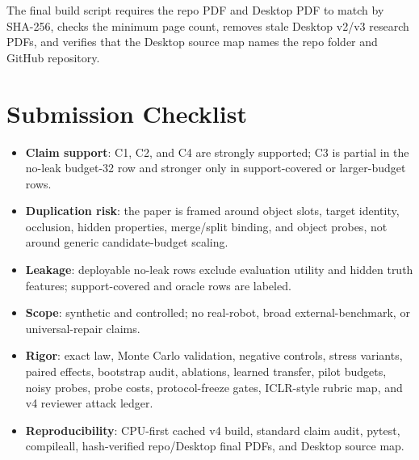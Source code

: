 \documentclass[10pt]{article}
\begin{document}
The final build script requires the repo PDF and Desktop PDF to match by SHA-256, checks the minimum page count, removes stale Desktop v2/v3 research PDFs, and verifies that the Desktop source map names the repo folder and GitHub repository.

\section{Submission Checklist}
\label{app:checklist}

\begin{itemize}
  \item \textbf{Claim support}: C1, C2, and C4 are strongly supported; C3 is partial in the no-leak budget-32 row and stronger only in support-covered or larger-budget rows.
  \item \textbf{Duplication risk}: the paper is framed around object slots, target identity, occlusion, hidden properties, merge/split binding, and object probes, not around generic candidate-budget scaling.
  \item \textbf{Leakage}: deployable no-leak rows exclude evaluation utility and hidden truth features; support-covered and oracle rows are labeled.
  \item \textbf{Scope}: synthetic and controlled; no real-robot, broad external-benchmark, or universal-repair claims.
  \item \textbf{Rigor}: exact law, Monte Carlo validation, negative controls, stress variants, paired effects, bootstrap audit, ablations, learned transfer, pilot budgets, noisy probes, probe costs, protocol-freeze gates, ICLR-style rubric map, and v4 reviewer attack ledger.
  \item \textbf{Reproducibility}: CPU-first cached v4 build, standard claim audit, pytest, compileall, hash-verified repo/Desktop final PDFs, and Desktop source map.
\end{itemize}
\end{document}
